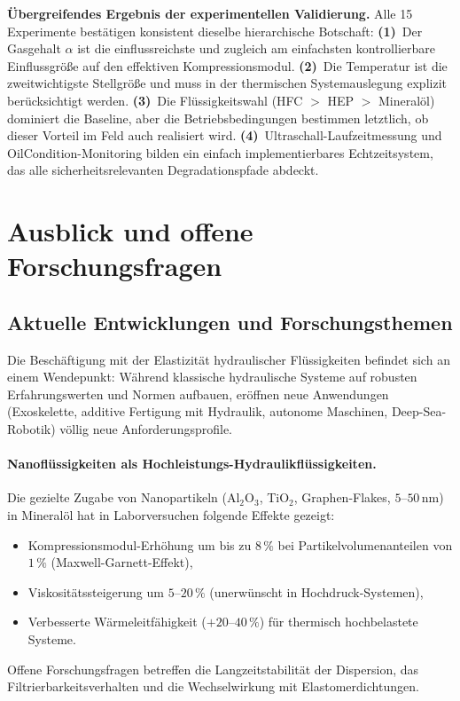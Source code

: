﻿\documentclass[a4paper,12pt]{scrreprt}
\theoremstyle{definition}
\begin{document}
\begin{infobox}
\textbf{Übergreifendes Ergebnis der experimentellen Validierung.}
Alle 15 Experimente bestätigen konsistent dieselbe hierarchische Botschaft:
\textbf{(1)}~Der Gasgehalt $\alpha$ ist die einflussreichste und zugleich
am einfachsten kontrollierbare Einflussgröße auf den effektiven
Kompressionsmodul.
\textbf{(2)}~Die Temperatur ist die zweitwichtigste Stellgröße und muss in
der thermischen Systemauslegung explizit berücksichtigt werden.
\textbf{(3)}~Die Flüssigkeitswahl (HFC $>$ HEP $>$ Mineralöl) dominiert die
Baseline, aber die Betriebsbedingungen bestimmen letztlich, ob dieser Vorteil
im Feld auch realisiert wird.
\textbf{(4)}~Ultraschall-Laufzeitmessung und OilCondition-Monitoring bilden
ein einfach implementierbares Echtzeitsystem, das alle sicherheitsrelevanten
Degradationspfade abdeckt.
\end{infobox}

\section{Ausblick und offene Forschungsfragen}

\subsection{Aktuelle Entwicklungen und Forschungsthemen}

Die Beschäftigung mit der Elastizität hydraulischer Flüssigkeiten befindet
sich an einem Wendepunkt: Während klassische hydraulische Systeme auf
robusten Erfahrungswerten und Normen aufbauen, eröffnen neue Anwendungen
(Exoskelette, additive Fertigung mit Hydraulik, autonome Maschinen, Deep-Sea-Robotik)
völlig neue Anforderungsprofile.

\paragraph{Nanoflüssigkeiten als Hochleistungs-Hydraulikflüssigkeiten.}
Die gezielte Zugabe von Nanopartikeln (Al$_2$O$_3$, TiO$_2$, Graphen-Flakes,
$5$--$50\,\mathrm{nm}$) in Mineralöl hat in Laborversuchen folgende
Effekte gezeigt:
\begin{itemize}
  \item Kompressionsmodul-Erhöhung um bis zu $8\,\%$ bei Partikelvolumen\-anteilen
    von $1\,\%$ (Maxwell-Garnett-Effekt),
  \item Viskositätssteigerung um $5$--$20\,\%$ (unerwünscht in Hochdruck-Systemen),
  \item Verbesserte Wärmeleitfähigkeit ($+20$--$40\,\%$) für thermisch
    hochbelastete Systeme.
\end{itemize}
Offene Forschungsfragen betreffen die Langzeitstabilität der Dispersion,
das Filtrierbarkeitsverhalten und die Wechselwirkung mit Elastomerdichtungen.
\end{document}
